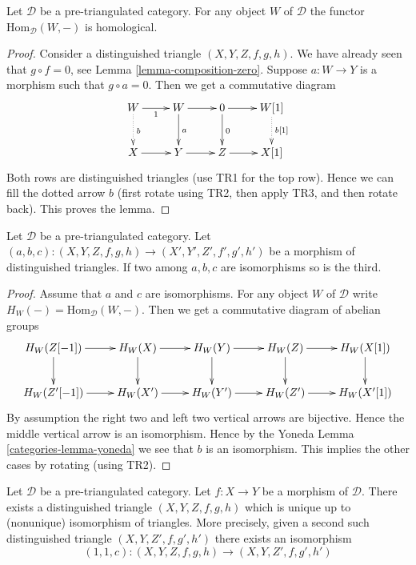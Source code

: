 \begin{lemma}
\label{lemma-representable-homological}
Let $\mathcal{D}$ be a pre-triangulated category.
For any object $W$ of $\mathcal{D}$ the functor
$\text{Hom}_{\mathcal{D}}(W, -)$ is homological.
\end{lemma}

\begin{proof}
Consider a distinguished triangle $(X, Y, Z, f, g, h)$.
We have already seen that $g \circ f = 0$, see
Lemma \ref{lemma-composition-zero}.
Suppose $a : W \to Y$ is a morphism such that $g \circ a = 0$.
Then we get a commutative diagram
$$
\xymatrix{
W \ar[r]_1 \ar@{..>}[d]^b &
W \ar[r] \ar[d]^a &
0 \ar[r] \ar[d]^0 &
W[1] \ar@{..>}[d]^{b[1]} \\
X \ar[r] & Y \ar[r] & Z \ar[r] & X[1]
}
$$
Both rows are distinguished triangles (use TR1 for the top row).
Hence we can fill the dotted arrow $b$ (first rotate using TR2,
then apply TR3, and then rotate back). This proves the lemma.
\end{proof}

\begin{lemma}
\label{lemma-third-isomorphism-triangle}
Let $\mathcal{D}$ be a pre-triangulated category.
Let $(a, b, c) : (X, Y, Z, f, g, h) \to (X', Y', Z', f', g', h')$
be a morphism of distinguished triangles. If two among $a, b, c$
are isomorphisms so is the third.
\end{lemma}

\begin{proof}
Assume that $a$ and $c$ are isomorphisms.
For any object $W$ of $\mathcal{D}$ write
$H_W( - ) = \text{Hom}_{\mathcal{D}}(W, -)$.
Then we get a commutative diagram of abelian groups
$$
\xymatrix{
H_W(Z[-1]) \ar[r] \ar[d] &
H_W(X) \ar[r] \ar[d] &
H_W(Y) \ar[r] \ar[d] &
H_W(Z) \ar[r] \ar[d] &
H_W(X[1]) \ar[d] \\
H_W(Z'[-1]) \ar[r] &
H_W(X') \ar[r] &
H_W(Y') \ar[r] &
H_W(Z') \ar[r] &
H_W(X'[1])
}
$$
By assumption the right two and left two vertical arrows are bijective.
Hence the middle vertical arrow is an isomorphism. Hence by the Yoneda
Lemma \ref{categories-lemma-yoneda} we see that $b$ is an isomorphism.
This implies the other cases by rotating (using TR2).
\end{proof}

\begin{lemma}
\label{lemma-cone-triangle-unique-isomorphism}
Let $\mathcal{D}$ be a pre-triangulated category.
Let $f : X \to Y$ be a morphism of $\mathcal{D}$.
There exists a distinguished triangle $(X, Y, Z, f, g, h)$ which
is unique up to (nonunique) isomorphism of triangles.
More precisely, given a second such distinguished triangle
$(X, Y, Z', f, g', h')$ there exists an isomorphism
$$
(1, 1, c) : (X, Y, Z, f, g, h) \longrightarrow (X, Y, Z', f, g', h')
$$
\end{lemma}

